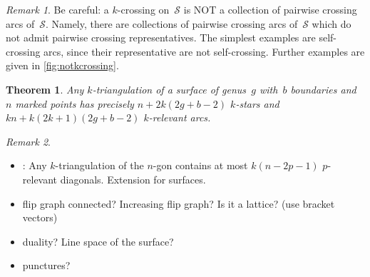 \documentclass{amsart}
\newtheorem{theorem}{Theorem}[section]
\theoremstyle{remark}
\newtheorem{remark}{Remark}[section]
\newcommand*{\ktg}[0]{$k$-triangulation\xspace}
\newcommand{\surface}{\mathcal{S}}
\newcommand{\vincent}[1]{\todo[color=blue!30]{#1 \\ \hfill --- V.}}
\begin{document}
\begin{remark}
Be careful: a $k$-crossing on~$\surface$ is NOT a collection of pairwise crossing arcs of~$\surface$. Namely, there are collections of pairwise crossing arcs of~$\surface$ which do not admit pairwise crossing representatives. The simplest examples are self-crossing arcs, since their representative are not self-crossing. Further examples are given in \cref{fig:notkcrossing}.
\vincent{Todo.}
\end{remark}

\begin{theorem}
\label{thm:structureSurface}
Any \ktg of a surface of genus~$g$ with~$b$ boundaries and~$n$ marked points has precisely $n + 2k(2g + b - 2)$ $k$-stars and $kn + k(2k + 1)(2g + b - 2)$ $k$-relevant arcs.
\end{theorem}


\begin{remark}
\begin{itemize}
\item \cite[Lem.~7.10]{PilaudSantos}: Any $k$-triangulation of the $n$-gon contains at most $k(n-2p-1)$ $p$-relevant diagonals. Extension for surfaces.
\item flip graph connected? Increasing flip graph? Is it a lattice? (use bracket vectors)
\item duality? Line space of the surface?
\item punctures?
\end{itemize}
\end{remark}
\end{document}
